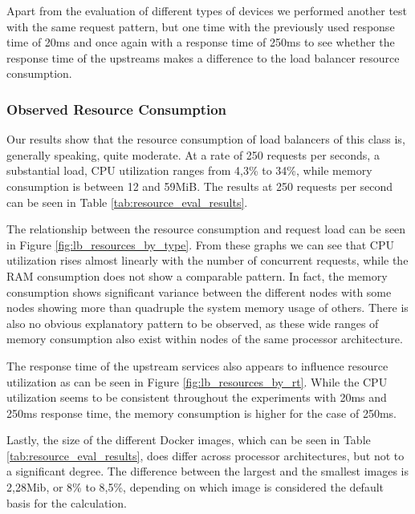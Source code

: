 Apart from the evaluation of different types of devices we performed another test with the same request pattern, but one time with the previously used response time of 20ms and once again with a response time of 250ms to see whether the response time of the upstreams makes a difference to the load balancer resource consumption.
\subsubsection{Observed Resource Consumption}
Our results show that the resource consumption of load balancers of this class is, generally speaking, quite moderate.
At a rate of 250 requests per seconds, a substantial load, CPU utilization ranges from 4,3\% to 34\%, while memory consumption is between 12 and 59MiB.
The results at 250 requests per second can be seen in Table \ref{tab:resource_eval_results}.

The relationship between the resource consumption and request load can be seen in Figure \ref{fig:lb_resources_by_type}.
From these graphs we can see that CPU utilization rises almost linearly with the number of concurrent requests, while the RAM consumption does not show a comparable pattern.
In fact, the memory consumption shows significant variance between the different nodes with some nodes showing more than quadruple the system memory usage of others.
There is also no obvious explanatory pattern to be observed, as these wide ranges of memory consumption also exist within nodes of the same processor architecture.

The response time of the upstream services also appears to influence resource utilization as can be seen in Figure \ref{fig:lb_resources_by_rt}.
While the CPU utilization seems to be consistent throughout the experiments with 20ms and 250ms response time, the memory consumption is higher for the case of 250ms.

Lastly, the size of the different Docker images, which can be seen in Table \ref{tab:resource_eval_results}, does differ across processor architectures, but not to a significant degree.
The difference between the largest and the smallest images is 2,28Mib, or 8\% to 8,5\%, depending on which image is considered the default basis for the calculation.


